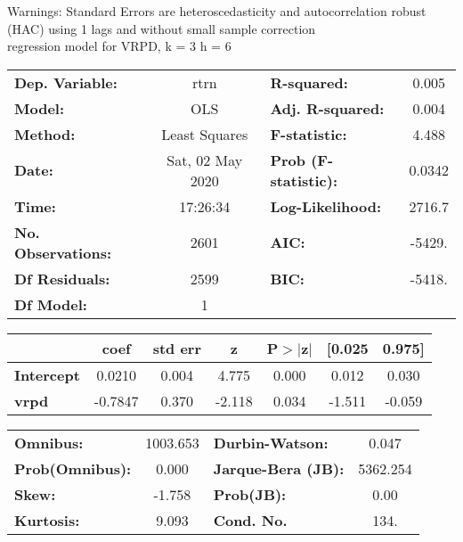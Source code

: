 Warnings: \newline
 [1] Standard Errors are heteroscedasticity and autocorrelation robust (HAC) using 1 lags and without small sample correction\\ 

regression model for VRPD, k = 3 h = 6\begin{center}
\begin{tabular}{lclc}
\toprule
\textbf{Dep. Variable:}    &       rtrn       & \textbf{  R-squared:         } &     0.005   \\
\textbf{Model:}            &       OLS        & \textbf{  Adj. R-squared:    } &     0.004   \\
\textbf{Method:}           &  Least Squares   & \textbf{  F-statistic:       } &     4.488   \\
\textbf{Date:}             & Sat, 02 May 2020 & \textbf{  Prob (F-statistic):} &   0.0342    \\
\textbf{Time:}             &     17:26:34     & \textbf{  Log-Likelihood:    } &    2716.7   \\
\textbf{No. Observations:} &        2601      & \textbf{  AIC:               } &    -5429.   \\
\textbf{Df Residuals:}     &        2599      & \textbf{  BIC:               } &    -5418.   \\
\textbf{Df Model:}         &           1      & \textbf{                     } &             \\
\bottomrule
\end{tabular}
\begin{tabular}{lcccccc}
                   & \textbf{coef} & \textbf{std err} & \textbf{z} & \textbf{P$> |$z$|$} & \textbf{[0.025} & \textbf{0.975]}  \\
\midrule
\textbf{Intercept} &       0.0210  &        0.004     &     4.775  &         0.000        &        0.012    &        0.030     \\
\textbf{vrpd}      &      -0.7847  &        0.370     &    -2.118  &         0.034        &       -1.511    &       -0.059     \\
\bottomrule
\end{tabular}
\begin{tabular}{lclc}
\textbf{Omnibus:}       & 1003.653 & \textbf{  Durbin-Watson:     } &    0.047  \\
\textbf{Prob(Omnibus):} &   0.000  & \textbf{  Jarque-Bera (JB):  } & 5362.254  \\
\textbf{Skew:}          &  -1.758  & \textbf{  Prob(JB):          } &     0.00  \\
\textbf{Kurtosis:}      &   9.093  & \textbf{  Cond. No.          } &     134.  \\
\bottomrule
\end{tabular}
\end{center}

